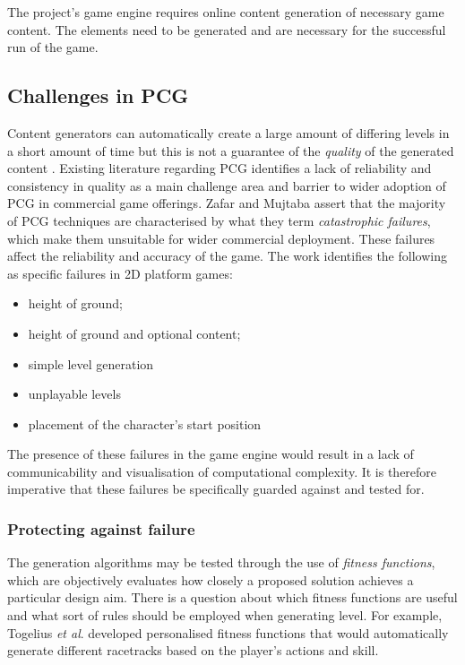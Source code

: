 \documentclass[11pt, a4paper, oneside]{report} %
\begin{document}
The project's game engine requires online content generation of necessary game
content. The elements need to be generated and are necessary for the successful
run of the game.

\subsection{Challenges in PCG}

Content generators can automatically create a large amount of differing levels
in a short amount of time but this is not a guarantee of the \textit{quality} of
the generated content \cite{Smith:2009:RLG:1536513.1536548}. Existing literature
regarding PCG identifies a lack of reliability and consistency in quality as a
main challenge area and barrier to wider adoption of PCG in commercial game
offerings. Zafar and Mujtaba \cite{6424299} assert that the majority of PCG
techniques are characterised by what they term \textit{catastrophic failures},
which make them unsuitable for wider commercial deployment. These failures
affect the reliability and accuracy of the game. The work identifies the
following as specific failures in 2D platform games:

\begin{itemize}

  \item height of ground;
  \item height of ground and optional content;
  \item simple level generation
  \item unplayable levels
  \item placement of the character's start position

\end{itemize}

\noindent The presence of these failures in the game engine would result in a
lack of communicability and visualisation of computational complexity. It is
therefore imperative that these failures be specifically guarded against and
tested for.

\subsubsection{Protecting against failure}

The generation algorithms may be tested through the use of \textit{fitness
functions}, which are objectively evaluates how closely a proposed solution
achieves a particular design aim. There is a question about which fitness
functions are useful and what sort of rules should be employed when generating
level. For example, Togelius \textit{et al}. \cite{togelius2007towards}
developed personalised fitness functions that would automatically generate
different racetracks based on the player's actions and skill.
\end{document}
